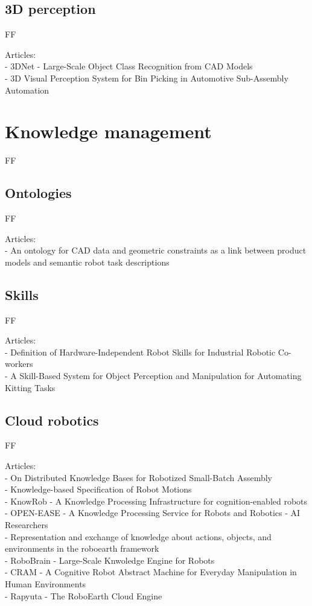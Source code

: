 \subsection{3D perception}

FF

Articles:\\
- 3DNet - Large-Scale Object Class Recognition from CAD Models\\
- 3D Visual Perception System for Bin Picking in Automotive Sub-Assembly Automation


\section{Knowledge management}

FF

\subsection{Ontologies}

FF

Articles:\\
- An ontology for CAD data and geometric constraints as a link between product models and semantic robot task descriptions


\subsection{Skills}

FF

Articles:\\
- Definition of Hardware-Independent Robot Skills for Industrial Robotic Co-workers\\
- A Skill-Based System for Object Perception and Manipulation for Automating Kitting Tasks


\subsection{Cloud robotics}

FF

Articles:\\
- On Distributed Knowledge Bases for Robotized Small-Batch Assembly\\
- Knowledge-based Specification of Robot Motions\\
- KnowRob - A Knowledge Processing Infrastructure for cognition-enabled robots\\
- OPEN-EASE - A Knowledge Processing Service for Robots and Robotics - AI Researchers\\
- Representation and exchange of knowledge about actions, objects, and environments in the roboearth framework\\
- RoboBrain - Large-Scale Knwoledge Engine for Robots\\
- CRAM - A Cognitive Robot Abstract Machine for Everyday Manipulation in Human Environments\\
- Rapyuta - The RoboEarth Cloud Engine


